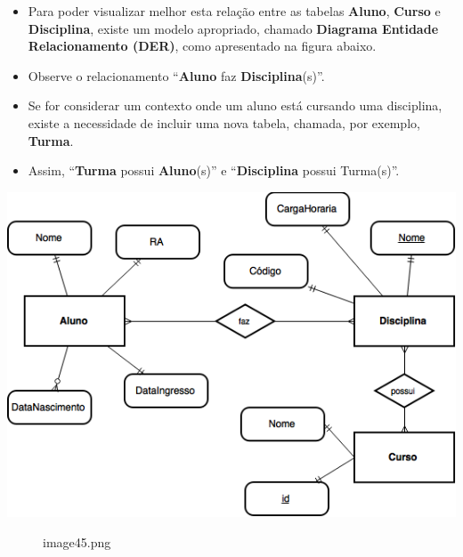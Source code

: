 \documentclass[12pt,a4paper]{article}
\begin{document}
    \begin{itemize}
\item
  Para poder visualizar melhor esta relação entre as tabelas
  \textbf{Aluno}, \textbf{Curso} e \textbf{Disciplina}, existe um modelo
  apropriado, chamado \textbf{Diagrama Entidade Relacionamento (DER)},
  como apresentado na figura abaixo.
\item
  Observe o relacionamento ``\textbf{Aluno} faz
  \textbf{Disciplina}(s)''.
\item
  Se for considerar um contexto onde um aluno está cursando uma
  disciplina, existe a necessidade de incluir uma nova tabela, chamada,
  por exemplo, \textbf{Turma}.
\item
  Assim, ``\textbf{Turma} possui \textbf{Aluno}(s)'' e
  ``\textbf{Disciplina} possui Turma(s)''.
\end{itemize}

\includegraphics{"figs/image45.png"}

    \begin{figure}
\centering
\caption{image45.png}
\end{figure}
\end{document}
